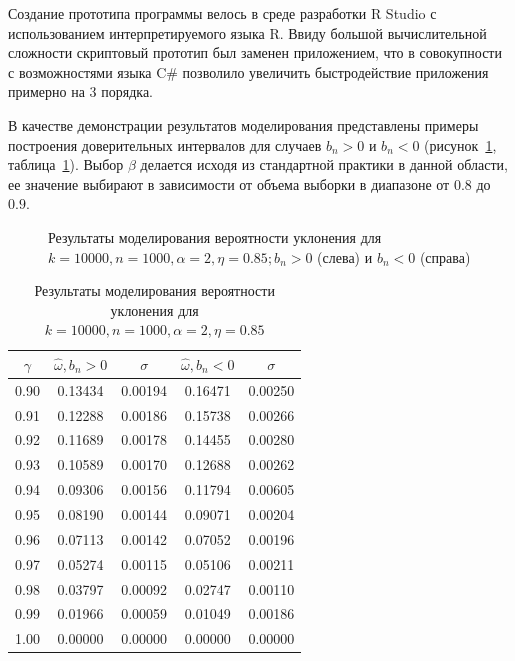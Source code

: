 \documentclass[12pt, specialist, subf, substylefile = spbu.rtx]{disser}
\begin{document}
Создание прототипа программы велось в среде разработки R Studio с использованием интерпретируемого языка R. Ввиду большой вычислительной сложности скриптовый прототип был заменен приложением, что в совокупности с возможностями языка C\# позволило увеличить быстродействие приложения примерно на 3 порядка.

В качестве демонстрации результатов моделирования представлены примеры построения доверительных интервалов для случаев $b_n > 0$ и $b_n < 0$ (рисунок~\ref{ris:imp}, таблица~\ref{table:imp}). Выбор $\beta$ делается исходя из стандартной практики в данной области, ее значение выбирают в зависимости от объема выборки в диапазоне от $0.8$ до $0.9$.

\begin{figure}[h]
\caption{Результаты моделирования вероятности уклонения для $k=10000, n=1000, \alpha=2, \eta=0.85; b_n > 0 $ (слева) и $b_n < 0$ (справа)}
\label{ris:imp}
\end{figure}

\begin{table}[ht]
\caption{Результаты моделирования вероятности уклонения для $k=10000, n=1000, \alpha=2, \eta=0.85$} 
\label{table:imp}
\centering
\begin{tabular}{c|cc|cc}
  \hline
$\gamma$ & $\hat{\omega}, b_n > 0$ & $\sigma$ & $\hat{\omega}, b_n < 0$ & $\sigma$ \\ 
  \hline
0.90 & 0.13434 & 0.00194 & 0.16471 & 0.00250 \\ 
0.91 & 0.12288 & 0.00186 & 0.15738 & 0.00266 \\ 
0.92 & 0.11689 & 0.00178 & 0.14455 & 0.00280 \\ 
0.93 & 0.10589 & 0.00170 & 0.12688 & 0.00262 \\ 
0.94 & 0.09306 & 0.00156 & 0.11794 & 0.00605 \\ 
0.95 & 0.08190 & 0.00144 & 0.09071 & 0.00204 \\ 
0.96 & 0.07113 & 0.00142 & 0.07052 & 0.00196 \\ 
0.97 & 0.05274 & 0.00115 & 0.05106 & 0.00211 \\ 
0.98 & 0.03797 & 0.00092 & 0.02747 & 0.00110 \\ 
0.99 & 0.01966 & 0.00059 & 0.01049 & 0.00186 \\ 
1.00 & 0.00000 & 0.00000 & 0.00000 & 0.00000 \\  
   \hline
\end{tabular}
\end{table}
\end{document}
